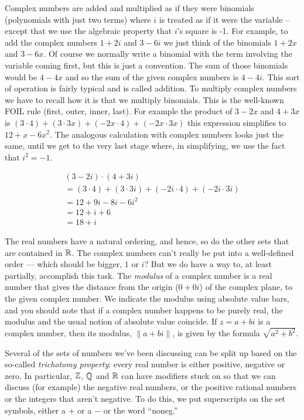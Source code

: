 Complex numbers are added and multiplied as if they were binomials
(polynomials with just two terms) where $i$ is treated as if it were 
the variable -- except that we use the algebraic property that $i$'s
square is -1.  For example, to add the complex numbers $1+2i$ and
$3-6i$ we just think of the binomials $1+2x$ and $3-6x$.  Of course we
normally write a binomial with the term involving the variable coming
first, but this is just a convention.  The sum of those binomials
would be $4-4x$ and so the sum of the given complex numbers is $4-4i$.
This sort of operation is fairly typical and is called 
 addition.  
To multiply complex numbers we have to
recall how it is that we multiply binomials.  This is the well-known
FOIL rule (first, outer, inner, last).  For example the product of
$3-2x$ and $4+3x$ is $(3\cdot 4) + (3 \cdot 3x) + (-2x\cdot 4) +
(-2x\cdot 3x)$ this expression simplifies to $12 + x - 6x^2$.  The
analogous calculation with complex numbers looks just the same, until
we get to the very last stage where, in simplifying, we use the fact
that $i^2=-1$.  

\begin{gather*}
 (3-2i)\cdot (4+3i) \\
= (3\cdot 4) + (3\cdot 3i) + (-2i\cdot 4) + (-2i\cdot 3i) \\
= 12 + 9i - 8i -6i^2 \\
= 12 + i + 6 \\
= 18 + i 
\end{gather*}


The real numbers have a natural ordering, and hence, so do the 
other sets that are contained in ${\mathbb R}$.  The complex numbers 
can't really be put into a well-defined order --- which should be
bigger, $1$  or $i$?  But we do have a way to, at least partially, 
accomplish this task.  The 
\emph{modulus} of a complex number is a real number that gives the
distance from the origin ($0+0i$) of the complex plane, to the given
complex number.  We indicate the modulus using absolute value bars,
and you should note that if a complex number happens to be purely
real, the modulus and the usual notion of absolute value coincide.
If $z = a + bi$ is a complex number, then its modulus, $\|a + bi \|$,
is given by the formula $\sqrt{a^2+b^2}$.  

Several of the sets of numbers we've been discussing can be split
up based on the so-called \emph{trichotomy property}:
every real number is either positive, negative or zero.  In particular,
${\mathbb Z}$, ${\mathbb Q}$ and ${\mathbb R}$ can have modifiers stuck on so
that we can discuss (for example) the negative real numbers, or the
positive rational numbers or the integers that aren't negative.  
To do this, we put superscripts on the set symbols, either a $+$ 
or a $-$ or the word ``noneg.''

